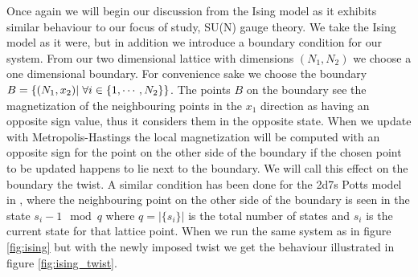 \documentclass[english,twoside,openright]{UH_TCM_MSc}
\begin{document}
Once again we will begin our discussion from the Ising model as it exhibits similar behaviour to our focus of study, SU(N) gauge theory. We take the Ising model as it were, but in addition we introduce a boundary condition for our system. From our two dimensional lattice with dimensions $(N_1,N_2)$ we choose a one dimensional boundary. For convenience sake we choose the boundary $B = \{(N_1,x_2) |\hspace{3px}\forall i \in \{1,\cdots,N_2\} \}$. The points $B$ on the boundary see the magnetization of the neighbouring points in the $x_1$ direction as having an opposite sign value, thus it considers them in the opposite state. When we update with Metropolis-Hastings the local magnetization will be computed with an opposite sign for the point on the other side of the boundary if the chosen point to be updated happens to lie next to the boundary. We will call this effect on the boundary the twist. A similar condition has been done for the 2d7s Potts model in \cite{twist}, where the neighbouring point on the other side of the boundary is seen in the state $s_i - 1 \mod q$ where $q = |\{s_i\}|$ is the total number of states and $s_i$ is the current state for that lattice point. When we run the same system as in figure \ref{fig:ising} but with the newly imposed twist we get the behaviour illustrated in figure \ref{fig:ising_twist}. 
\end{document}
